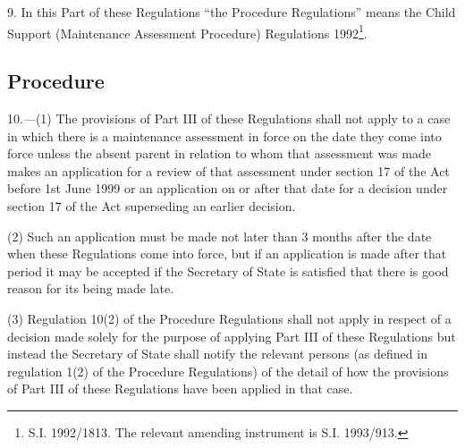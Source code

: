 \documentclass[12pt,a4paper]{article}
\begin{document}
9.  In this Part of these Regulations “the Procedure Regulations” means the Child Support (Maintenance Assessment Procedure) Regulations 1992\footnote{\frenchspacing S.I. 1992/1813. The relevant amending instrument is S.I. 1993/913.}.

\subsection[10. Procedure]{Procedure}

10.—(1) The provisions of Part III of these Regulations shall not apply to a case in which there is a maintenance assessment in force on the date they come into force unless the absent parent in relation to whom that assessment was made makes an application for a review of that assessment under section 17 of the Act
before 1st June 1999 or an application on or after that date for a decision under section 17 of the Act superseding an earlier decision.  %

(2) Such an application must be made not later than 3 months after the date when these Regulations come into force, but if an application is made after that period it may be accepted if the Secretary of State is satisfied that there is good reason for its being made late.


(3) Regulation 10(2) of the Procedure Regulations shall not apply in respect of a decision made solely for the purpose of applying Part III of these Regulations but instead the Secretary of State shall notify the relevant persons (as defined in regulation 1(2) of the Procedure Regulations) of the detail of how the provisions of Part III of these Regulations have been applied in that case.

\end{document}
